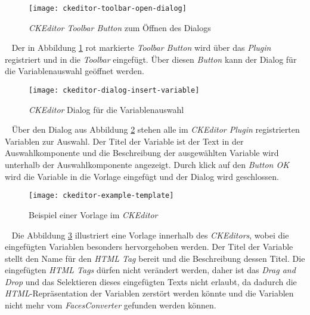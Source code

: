 \begin{figure}[h]
\centering
\texttt{[image: ckeditor-toolbar-open-dialog]}
\caption{\emph{CKEditor Toolbar Button} zum Öffnen des Dialogs}
\label{fig:ckeditor-toolbar-opne-dialog}
\end{figure}
\ \newline
Der in Abbildung \ref{fig:ckeditor-toolbar-opne-dialog} rot markierte \emph{Toolbar Button} wird über das \emph{Plugin} registriert und in die \emph{Toolbar} eingefügt. Über diesen \emph{Button} kann der Dialog für die Variablenauswahl geöffnet werden.
\begin{figure}[h]
\centering
\texttt{[image: ckeditor-dialog-insert-variable]}
\caption{\emph{CKEditor} Dialog für die Variablenauswahl}
\label{fig:ckeditor-dialog-insert-variable}
\end{figure}
\ \newline
Über den Dialog aus Abbildung \ref{fig:ckeditor-dialog-insert-variable} stehen alle im \emph{CKEditor Plugin} registrierten Variablen zur Auswahl. Der Titel der Variable ist der Text in der Auswahlkomponente und die Beschreibung der ausgewählten Variable wird unterhalb der Auswahlkomponente angezeigt. Durch klick auf den \emph{Button OK} wird die Variable in die Vorlage eingefügt und der Dialog wird geschlossen.
\begin{figure}[h]
\centering
\texttt{[image: ckeditor-example-template]}
\caption{Beispiel einer Vorlage im \emph{CKEditor}}
\label{fig:ckeditor-example-template}
\end{figure}
\ \newline 
Die Abbildung \ref{fig:ckeditor-example-template} illustriert eine Vorlage innerhalb des \emph{CKEditors}, wobei die eingefügten Variablen besonders hervorgehoben werden. Der Titel der Variable stellt den Name für den \emph{HTML Tag} bereit und die Beschreibung dessen Titel. Die eingefügten \emph{HTML Tags} dürfen nicht verändert werden, daher ist das \emph{Drag and Drop} und das Selektieren dieses eingefügten Texts nicht erlaubt, da dadurch die \emph{HTML}-Repräsentation der Variablen zerstört werden könnte und die Variablen nicht mehr vom \emph{FacesConverter} gefunden werden können.
\newpage

